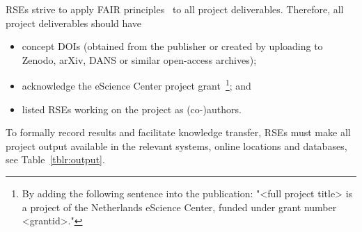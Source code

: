 RSEs strive to apply FAIR principles~\cite{fair-principles,FAIR4RS} to all project deliverables. Therefore, all project deliverables should have

\begin{itemize}
\item concept DOIs (obtained from the publisher or created by uploading to Zenodo, arXiv, DANS or similar open-access
archives);
\item acknowledge the eScience Center project grant~\footnote{By adding the following sentence into the publication: "<full project title> is a project of the Netherlands eScience Center, funded under grant number <grantid>."}; and
\item listed RSEs working on the project as (co-)authors.
\end{itemize}

To formally record results and facilitate knowledge transfer, RSEs must make all project output available in the
relevant systems, online locations and databases, see Table~\ref{tblr:output}.


